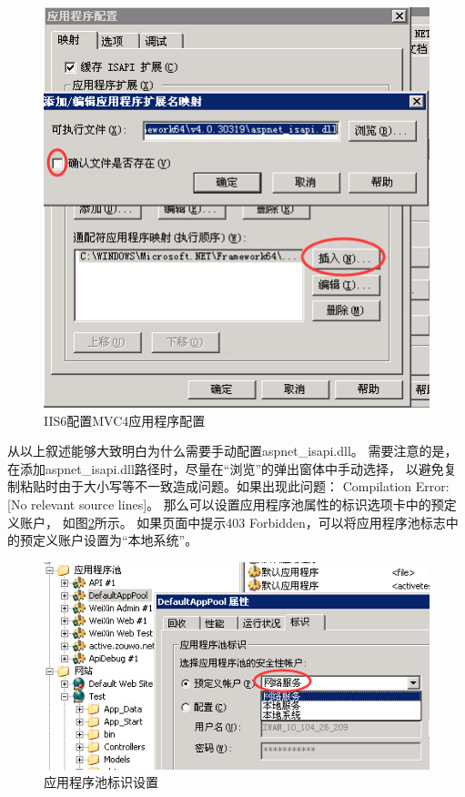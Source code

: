 \documentclass{book}
\begin{document}
\begin{figure}[htbp]
	\centering
	\includegraphics[scale=0.8]{IIS6MVC4AppConfig.jpg}
	\caption{IIS6配置MVC4应用程序配置}
	\label{fig:IIS6MVC4AppConfig}
\end{figure}

从以上叙述能够大致明白为什么需要手动配置aspnet\_isapi.dll。
需要注意的是，在添加aspnet\_isapi.dll路径时，尽量在“浏览”的弹出窗体中手动选择，
以避免复制粘贴时由于大小写等不一致造成问题。如果出现此问题：
Compilation Error: [No relevant source lines]。
那么可以设置应用程序池属性的标识选项卡中的预定义账户，
如图\ref{fig:AspNetAppPoolIdentitySetting}所示。
如果页面中提示403 Forbidden，可以将应用程序池标志中的预定义账户设置为“本地系统”。

\begin{figure}[htbp]
	\centering
	\includegraphics[scale=0.8]{AspNetAppPoolIdentitySetting.jpg}
	\caption{应用程序池标识设置}
	\label{fig:AspNetAppPoolIdentitySetting}
\end{figure}
\end{document}
